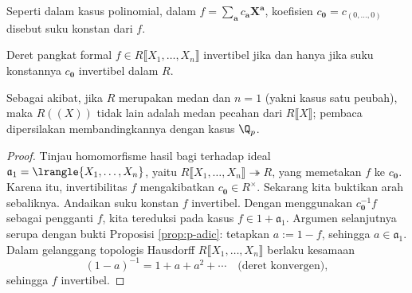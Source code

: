 Seperti dalam kasus polinomial, dalam $f = \sum_{\bm{a}} c_{\bm{a}} \bm{X}^{\bm{a}}$, koefisien $c_{\bm{0}} = c_{(0, \ldots, 0)}$ disebut suku konstan dari $f$.

\begin{proposition}
	Deret pangkat formal $f \in R\llbracket X_1, \ldots, X_n \rrbracket$ invertibel jika dan hanya jika suku konstannya $c_{\bm{0}}$ invertibel dalam $R$.
\end{proposition}
Sebagai akibat, jika $R$ merupakan medan dan $n=1$ (yakni kasus satu peubah), maka $R(\!(X)\!)$ tidak lain adalah medan pecahan dari $R \llbracket X \rrbracket$; pembaca dipersilakan membandingkannya dengan kasus $\Q_p$.

\begin{proof}
	Tinjau homomorfisme hasil bagi terhadap ideal $\mathfrak{a}_1 = \lrangle{X_1, \ldots, X_n}$, yaitu $R\llbracket X_1, \ldots, X_n \rrbracket \twoheadrightarrow R$, yang memetakan $f$ ke $c_{\bm{0}}$. Karena itu, invertibilitas $f$ mengakibatkan $c_{\bm{0}} \in R^\times$. Sekarang kita buktikan arah sebaliknya. Andaikan suku konstan $f$ invertibel. Dengan menggunakan $c_{\bm{0}}^{-1} f$ sebagai pengganti $f$, kita tereduksi pada kasus $f \in 1 + \mathfrak{a}_1$. Argumen selanjutnya serupa dengan bukti Proposisi \ref{prop:p-adic}: tetapkan $a := 1 - f$, sehingga $a \in \mathfrak{a}_1$. Dalam gelanggang topologis Hausdorff $R \llbracket X_1, \ldots, X_n \rrbracket$ berlaku kesamaan
	\[ (1-a)^{-1} = 1 + a + a^2 + \cdots \quad \text{(deret konvergen)}, \]
	sehingga $f$ invertibel.
\end{proof}

